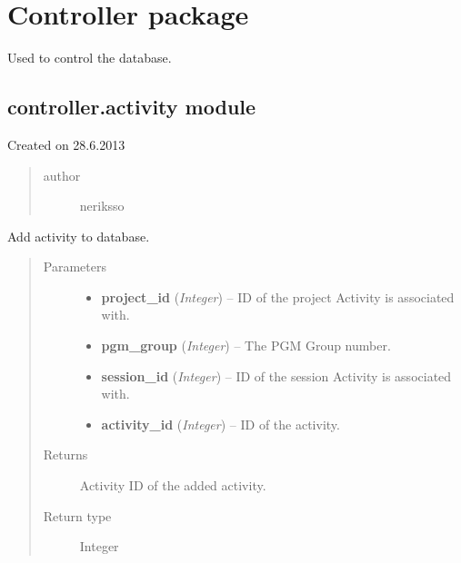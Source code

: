 \documentclass[letterpaper,10pt,english]{sphinxmanual}
\begin{document}
\section{Controller package}
\label{controller::doc}\label{controller:controller-package}
Used to control the database.


\subsection{controller.activity module}
\label{controller:module-controller.activity}\label{controller:controller-activity-module}
Created on 28.6.2013
\begin{quote}\begin{description}
\item[{author}] \leavevmode
neriksso

\end{description}\end{quote}

\begin{fulllineitems}
\label{controller:controller.activity.add_or_update_activity}
Add activity to database.
\begin{quote}\begin{description}
\item[{Parameters}] \leavevmode\begin{itemize}
\item {} 
\textbf{project\_id} (\emph{Integer}) -- ID of the project Activity is associated with.

\item {} 
\textbf{pgm\_group} (\emph{Integer}) -- The PGM Group number.

\item {} 
\textbf{session\_id} (\emph{Integer}) -- ID of the session Activity is associated with.

\item {} 
\textbf{activity\_id} (\emph{Integer}) -- ID of the activity.

\end{itemize}

\item[{Returns}] \leavevmode
Activity ID of the added activity.

\item[{Return type}] \leavevmode
Integer

\end{description}\end{quote}

\end{fulllineitems}
\end{document}
